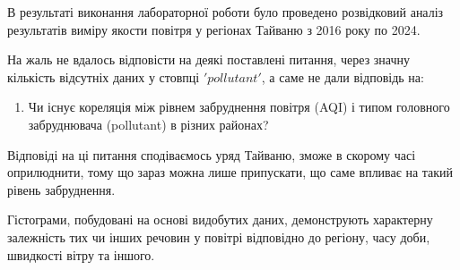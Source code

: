 \documentclass{article}
\begin{document}
В результаті виконання лабораторної роботи було проведено розвідковий
аналіз результатів виміру якости повітря у регіонах Тайваню з 2016 року по 2024. 

На жаль не вдалось відповісти на деякі поставлені питання, 
через значну кількість відсутніх даних у стовпці $'pollutant'$, а саме не дали відповідь на: 
\begin{enumerate}
    
    \item  Чи існує кореляція між рівнем забруднення повітря (AQI) і типом головного забруднювача (pollutant) в різних районах?
    
\end{enumerate}
Відповіді на ці питання сподіваємось уряд Тайваню, зможе в скорому часі оприлюднити, 
тому що зараз можна лише припускати, що саме впливає на такий рівень забруднення.

Гістограми, побудовані на основі видобутих даних, демонструють характерну залежність тих чи інших речовин 
у повітрі відповідно до регіону, часу доби, швидкості вітру та іншого.
\end{document}
